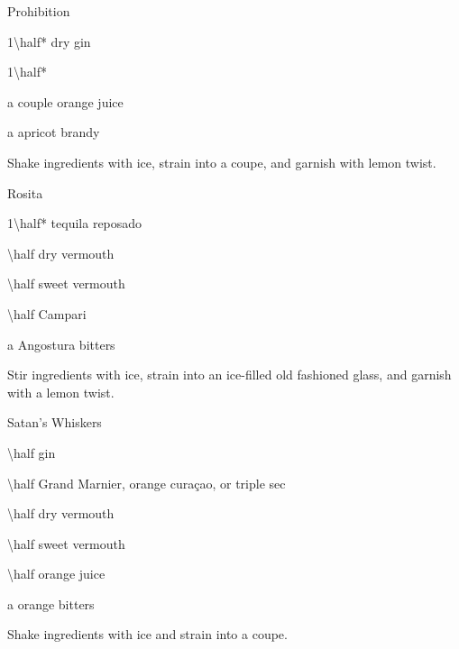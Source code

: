 \begin{Cocktail}{Prohibition}
	\begin{Ingredients}
	\item \SI{1\half*}{\oz} dry gin
	\item \SI{1\half*}{\oz} \Lillet
	\item a couple \si{\dashes} orange juice
	\item a \si{\dash} apricot brandy
	\end{Ingredients}
	
	\begin{Instructions}
	Shake ingredients with ice, strain into a coupe, and garnish with lemon twist.
	\end{Instructions}
\end{Cocktail}

\begin{Cocktail}{Rosita}
	\begin{Ingredients}
	\item \SI{1\half*}{\oz} tequila reposado
	\item \SI{\half}{\oz} dry vermouth
	\item \SI{\half}{\oz} sweet vermouth
	\item \SI{\half}{\oz} Campari
	\item a \si{\dash} Angostura bitters
	\end{Ingredients}
	
	\begin{Instructions}
	Stir ingredients with ice, strain into an ice-filled old fashioned glass, and garnish with a lemon twist.
	\end{Instructions}
\end{Cocktail}

\begin{Cocktail}{Satan's Whiskers}
	\begin{Ingredients}
	\item \SI{\half}{\oz} gin
	\item \SI{\half}{\oz} Grand Marnier, orange cura\c{c}ao, or triple sec
	\item \SI{\half}{\oz} dry vermouth
	\item \SI{\half}{\oz} sweet vermouth
	\item \SI{\half}{\oz} orange juice
	\item a \si{\dash} orange bitters
	\end{Ingredients}
	
	\begin{Instructions}
	Shake ingredients with ice and strain into a coupe.
	\end{Instructions}
\end{Cocktail}

